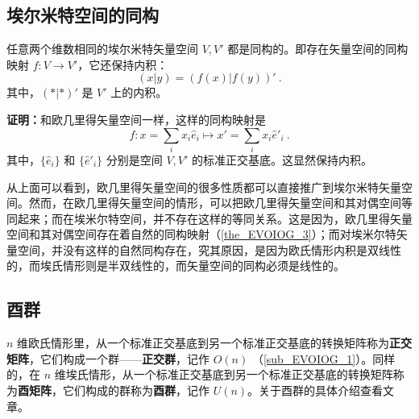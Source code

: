 \subsection{埃尔米特空间的同构}
\begin{theorem}{}
任意两个维数相同的埃尔米特矢量空间 $V,V'$ 都是同构的。即存在矢量空间的同构映射 $f:V\rightarrow V'$，它还保持内积：
\begin{equation}
(  x|  y)=(f(  x)|f(  y))'~.
\end{equation}
其中，$(*|*)'$ 是 $V'$ 上的内积。
\end{theorem}
\textbf{证明：}和欧几里得矢量空间一样，这样的同构映射是
\begin{equation}
f:  x=\sum_{i}x_i  \hat e_i\mapsto  x'=\sum_i x_i \hat e'_i~.
\end{equation}
其中，$\{ \hat e_i\}$ 和 $\{ \hat e'_i\}$ 分别是空间 $V,V'$ 的标准正交基底。这显然保持内积。

从上面可以看到，欧几里得矢量空间的很多性质都可以直接推广到埃尔米特矢量空间。然而，在欧几里得矢量空间的情形，可以把欧几里得矢量空间和其对偶空间等同起来；而在埃米尔特空间，并不存在这样的等同关系。这是因为，欧几里得矢量空间和其对偶空间存在着自然的同构映射（\autoref{the_EVOIOG_3}）；而对埃米尔特矢量空间，并没有这样的自然同构存在，究其原因，是因为欧氏情形内积是双线性的，而埃氏情形则是半双线性的，而矢量空间的同构必须是线性的。
\subsection{酉群}
 $n$ 维欧氏情形里，从一个标准正交基底到另一个标准正交基底的转换矩阵称为\textbf{正交矩阵}，它们构成一个群——\textbf{正交群}，记作 $O(n)$ （\autoref{sub_EVOIOG_1}）。同样的，在 $n$ 维埃氏情形，从一个标准正交基底到另一个标准正交基底的转换矩阵称为\textbf{酉矩阵}，它们构成的群称为\textbf{酉群}，记作 $U(n)$。关于酉群的具体介绍查看文章。
